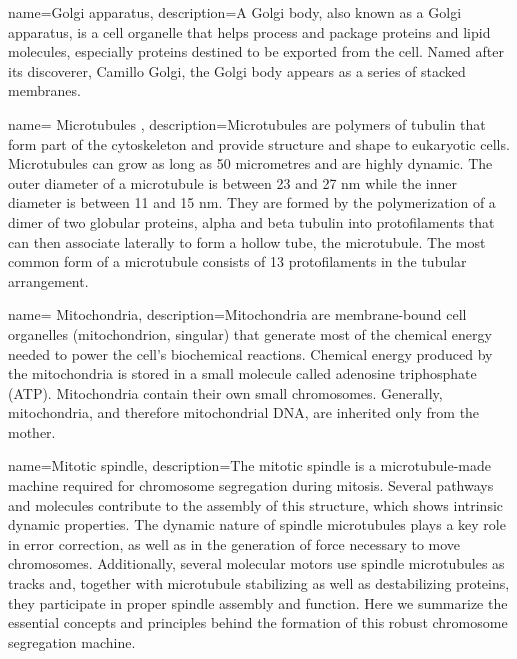  {
	name={Golgi apparatus},
	description={A Golgi body, also known as a Golgi apparatus, is a cell organelle that helps process and package proteins and lipid molecules, especially proteins destined to be exported from the cell. Named after its discoverer, Camillo Golgi, the Golgi body appears as a series of stacked membranes.}}


 {
	name= {Microtubules} ,
	description={Microtubules are polymers of tubulin that form part of the cytoskeleton and provide structure and shape to eukaryotic cells. Microtubules can grow as long as 50 micrometres and are highly dynamic. The outer diameter of a microtubule is between 23 and 27 nm while the inner diameter is between 11 and 15 nm. They are formed by the polymerization of a dimer of two globular proteins, alpha and beta tubulin into protofilaments that can then associate laterally to form a hollow tube, the microtubule. The most common form of a microtubule consists of 13 protofilaments in the tubular arrangement.}}


 {
	name= {Mitochondria},
	description={Mitochondria are membrane-bound cell organelles (mitochondrion, singular) that generate most of the chemical energy needed to power the cell's biochemical reactions. Chemical energy produced by the mitochondria is stored in a small molecule called adenosine triphosphate (ATP). Mitochondria contain their own small chromosomes. Generally, mitochondria, and therefore mitochondrial DNA, are inherited only from the mother. }}


 {
	name={Mitotic spindle},
	description={The mitotic spindle is a microtubule-made machine required for chromosome segregation during mitosis. Several pathways and molecules contribute to the assembly of this structure, which shows intrinsic dynamic properties. The dynamic nature of spindle microtubules plays a key role in error correction, as well as in the generation of force necessary to move chromosomes. Additionally, several molecular motors use spindle microtubules as tracks and, together with microtubule stabilizing as well as destabilizing proteins, they participate in proper spindle assembly and function. Here we summarize the essential concepts and principles behind the formation of this robust chromosome segregation machine.}}

